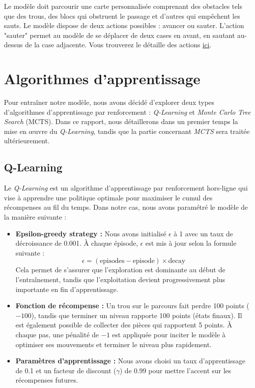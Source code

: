\documentclass[a4paper,12pt]{article}
\begin{document}
        Le modèle doit parcourir une carte personnalisée comprenant des obstacles tels que des trous, des blocs qui obstruent le passage et d'autres qui empêchent les sauts. Le modèle dispose de deux actions possibles : avancer ou sauter. L'action "sauter" permet au modèle de se déplacer de deux cases en avant, en sautant au-dessus de la case adjacente. Vous trouverez le détaille des actions \href{https://github.com/H4znow/marioBrossGame/tree/main}{ici}.
    
    \section{Algorithmes d'apprentissage}
    
        Pour entraîner notre modèle, nous avons décidé d'explorer deux types d'algorithmes d'apprentissage par renforcement : \textit{Q-Learning} et \textit{Monte Carlo Tree Search} (MCTS). Dans ce rapport, nous détaillerons dans un premier temps la mise en œuvre du \textit{Q-Learning}, tandis que la partie concernant \textit{MCTS} sera traitée ultérieurement.
        
        \subsection{Q-Learning}
        
            Le \textit{Q-Learning} est un algorithme d'apprentissage par renforcement hors-ligne qui vise à apprendre une politique optimale pour maximiser le cumul des récompenses au fil du temps. Dans notre cas, nous avons paramétré le modèle de la manière suivante :
            
            \begin{itemize}
                \item \textbf{Epsilon-greedy strategy :} Nous avons initialisé $\epsilon$ à 1 avec un taux de décroissance de 0.001. À chaque épisode, $\epsilon$ est mis à jour selon la formule suivante : 
                \[
                \epsilon = (\text{episodes} - \text{episode}) \times \text{decay}
                \]
                Cela permet de s'assurer que l'exploration est dominante au début de l'entraînement, tandis que l'exploitation devient progressivement plus importante en fin d'apprentissage.
                
                \item \textbf{Fonction de récompense :} Un trou sur le parcours fait perdre 100 points ($-100$), tandis que terminer un niveau rapporte 100 points  (états finaux). Il est également possible de collecter des pièces qui rapportent 5 points. À chaque pas, une pénalité de $-1$ est appliquée pour inciter le modèle à optimiser ses mouvements et terminer le niveau plus rapidement.
                
                \item \textbf{Paramètres d'apprentissage :} Nous avons choisi un taux d'apprentissage de 0.1 et un facteur de discount ($\gamma$) de 0.99 pour mettre l'accent sur les récompenses futures.
            \end{itemize}
\end{document}
